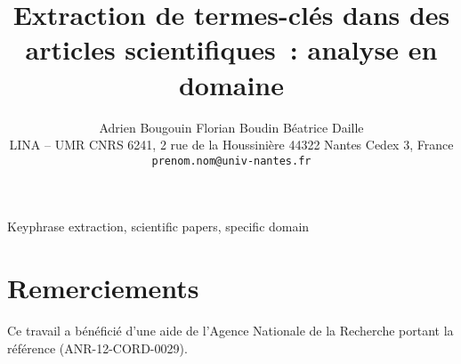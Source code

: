 \documentclass[10pt,a4paper,twoside]{article}
\title{Extraction de termes-clés dans des articles scientifiques~: analyse en domaine}
\author{Adrien Bougouin \quad Florian Boudin \quad Béatrice Daille\\
        {\small{LINA -- UMR CNRS 6241, 2 rue de la Houssinière 44322 Nantes Cedex 3, France\\ 
         \texttt{prenom.nom@univ-nantes.fr}}}}
\begin{document}
\maketitle


          {Keyphrase extraction, scientific papers, specific domain}









\section*{Remerciements}
  Ce travail a bénéficié d'une aide de l'Agence Nationale de la Recherche
  portant la référence (ANR-12-CORD-0029).





\end{document}
